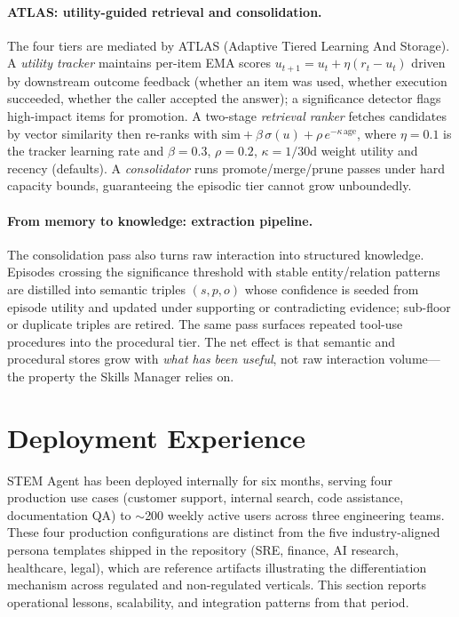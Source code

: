 \documentclass[11pt]{article}
\begin{document}
\paragraph{ATLAS: utility-guided retrieval and consolidation.} The four tiers are mediated by ATLAS (Adaptive Tiered Learning And Storage). A \emph{utility tracker} maintains per-item EMA scores $u_{t+1} = u_t + \eta(r_t - u_t)$ driven by downstream outcome feedback (whether an item was used, whether execution succeeded, whether the caller accepted the answer); a significance detector flags high-impact items for promotion. A two-stage \emph{retrieval ranker} fetches candidates by vector similarity then re-ranks with $\mathrm{sim} + \beta\,\sigma(u) + \rho\,e^{-\kappa\,\mathrm{age}}$, where $\eta{=}0.1$ is the tracker learning rate and $\beta{=}0.3$, $\rho{=}0.2$, $\kappa{=}1/30\mathrm{d}$ weight utility and recency (defaults). A \emph{consolidator} runs promote/merge/prune passes under hard capacity bounds, guaranteeing the episodic tier cannot grow unboundedly.

\paragraph{From memory to knowledge: extraction pipeline.} The consolidation pass also turns raw interaction into structured knowledge. Episodes crossing the significance threshold with stable entity/relation patterns are distilled into semantic triples $(\textit{s}, \textit{p}, \textit{o})$ whose confidence is seeded from episode utility and updated under supporting or contradicting evidence; sub-floor or duplicate triples are retired. The same pass surfaces repeated tool-use procedures into the procedural tier. The net effect is that semantic and procedural stores grow with \emph{what has been useful}, not raw interaction volume---the property the Skills Manager relies on.

\section{Deployment Experience}
\label{sec:deployment}

STEM Agent has been deployed internally for six months, serving four production use cases (customer support, internal search, code assistance, documentation QA) to $\sim$200 weekly active users across three engineering teams. These four production configurations are distinct from the five industry-aligned persona templates shipped in the repository (SRE, finance, AI research, healthcare, legal), which are reference artifacts illustrating the differentiation mechanism across regulated and non-regulated verticals. This section reports operational lessons, scalability, and integration patterns from that period.
\end{document}
